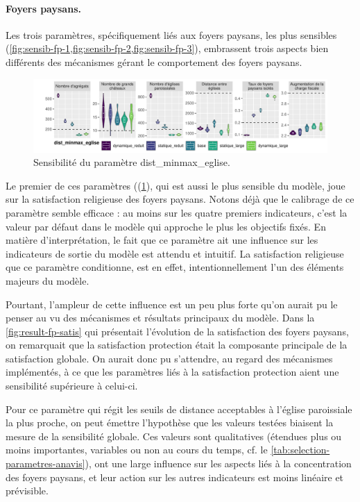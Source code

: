 \paragraph{Foyers paysans.}
Les trois paramètres, spécifiquement liés aux foyers paysans, les plus sensibles (\cref{fig:sensib-fp-1,fig:sensib-fp-2,fig:sensib-fp-3}), embrassent trois aspects bien différents des mécanismes gérant le comportement des foyers paysans.

\begin{figure}[H]
	\centering
	\includegraphics[width=\linewidth]{img/sensib/sensibilite_dist_minmax_eglise.pdf}
	\caption{Sensibilité du paramètre \textsf{dist\_minmax\_eglise}.}
	\label{fig:sensib-fp-1}
\end{figure}

Le premier de ces paramètres ((\cref{fig:sensib-fp-1}), qui est aussi le plus sensible du modèle, joue sur la satisfaction religieuse des foyers paysans.
Notons déjà que le calibrage de ce paramètre semble efficace : au moins sur les quatre premiers indicateurs, c'est la valeur par défaut dans le modèle qui approche le plus les objectifs fixés.
En matière d'interprétation, le fait que ce paramètre ait une influence sur les indicateurs de sortie du modèle est attendu et intuitif.
La satisfaction religieuse que ce paramètre conditionne, est en effet, intentionnellement l'un des éléments majeurs du modèle.

Pourtant, l'ampleur de cette influence est un peu plus forte qu'on aurait pu le penser au vu des mécanismes et résultats principaux du modèle.
Dans la \cref{fig:result-fp-satis} qui présentait l'évolution de la satisfaction des foyers paysans, on remarquait que la satisfaction protection était la composante principale de la satisfaction globale.
On aurait donc pu s'attendre, au regard des mécanismes implémentés, à ce que les paramètres liés à la satisfaction protection aient une sensibilité supérieure à celui-ci.

Pour ce paramètre qui régit les seuils de distance acceptables à l'église paroissiale la plus proche, on peut émettre l'hypothèse que les valeurs testées biaisent la mesure de la sensibilité globale.
Ces valeurs sont qualitatives (étendues plus ou moins importantes, variables ou non au cours du temps, cf. le \cref{tab:selection-parametres-anavis}), ont une large influence sur les aspects liés à la concentration des foyers paysans, et leur action sur les autres indicateurs est moins linéaire et prévisible.

